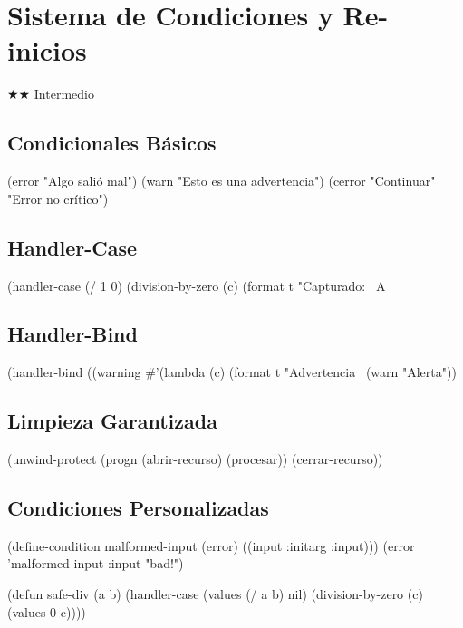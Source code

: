 \chapter{Sistema de Condiciones y Re-inicios}
\label{chap:conditions}
{\huge$\bigstar$}{\huge$\bigstar$} Intermedio

\section{Condicionales Básicos}
\begin{lispcode}
(error "Algo salió mal")
(warn "Esto es una advertencia")
(cerror "Continuar" "Error no crítico")
\end{lispcode}

\section{Handler-Case}
\begin{lispcode}
(handler-case (/ 1 0)
  (division-by-zero (c) (format t "Capturado: ~A~%
\end{lispcode}

\section{Handler-Bind}
\begin{lispcode}
(handler-bind ((warning #'(lambda (c) (format t "Advertencia~%
  (warn "Alerta"))
\end{lispcode}

\section{Limpieza Garantizada}
\begin{lispcode}
(unwind-protect (progn (abrir-recurso) (procesar)) (cerrar-recurso))
\end{lispcode}

\section{Condiciones Personalizadas}
\begin{lispcode}
(define-condition malformed-input (error) ((input :initarg :input)))
(error 'malformed-input :input "bad!")
\end{lispcode}

\begin{examplebox}[title=División segura]
\begin{lispcode}
(defun safe-div (a b)
  (handler-case (values (/ a b) nil)
    (division-by-zero (c) (values 0 c))))
\end{lispcode}
\end{examplebox}

